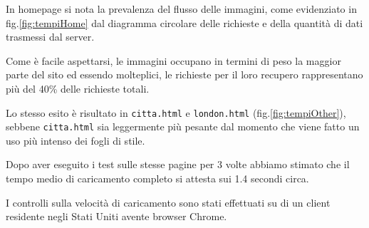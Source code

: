 In homepage si nota la prevalenza del flusso delle immagini, come evidenziato
in fig.\ref{fig:tempiHome} dal diagramma circolare delle richieste e della
quantità di dati trasmessi dal server.

Come è facile aspettarsi, le immagini occupano in termini di peso la maggior
parte del sito ed essendo molteplici, le richieste per il loro recupero
rappresentano più del 40\% delle richieste totali.


Lo stesso esito è risultato in \texttt{citta.html} e \texttt{london.html}
(fig.\ref{fig:tempiOther}), sebbene \texttt{citta.html} sia leggermente più pesante dal momento che viene fatto un uso più intenso dei fogli di stile.

Dopo aver eseguito i test sulle stesse pagine per 3 volte abbiamo stimato che il tempo medio di caricamento completo si attesta sui 1.4 secondi circa.

I controlli sulla velocità di caricamento sono stati effettuati su di un client residente negli Stati Uniti avente browser Chrome.


